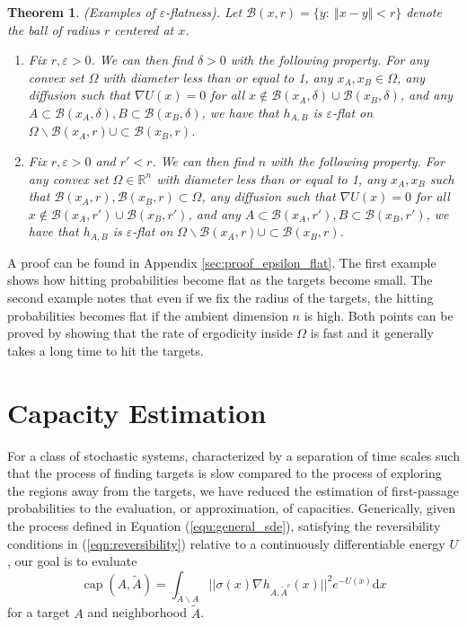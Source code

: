 \documentclass[12pt, nofootinbib,english, amsmath, amssymb, aps, priprint, graphicx,floatfix]{revtex4-1}
\newtheorem{theorem}{Theorem}
\theoremstyle{plain}
\theoremstyle{definition}
\theoremstyle{plain}
\newcommand{\bb}[1]{\mathcal{B}\left(#1\right)}
\newcommand{\tA}{{\tilde A}}
\begin{document}
\begin{theorem}\label{thm:epsilon_flat} (Examples of $\varepsilon$-flatness).   Let $\bb{x,r} = \{y:\ \Vert x-y \Vert < r\}$ denote the ball of radius $r$ centered at $x$.  
\begin{enumerate}
    \item Fix $r,\varepsilon>0$.  We can then find $\delta>0$ with the following property.  For any convex set $\Omega$ with diameter less than or equal to 1, any $x_A,x_B \in \Omega$, any diffusion such that $\nabla U(x) =0$ for all $x\notin \bb{x_A, \delta} \cup \bb{x_B, \delta}$, and any $A\subset \bb{x_A, \delta}, B \subset \bb{x_B, \delta}$, we have that $h_{A,B}$ is $\varepsilon$-flat on $\Omega \backslash \bb{x_A, r} \cup \subset \bb{x_B, r}$.

    \item Fix $r,\varepsilon>0$ and $r'<r$.  We can then find $n$ with the following property.  For any convex set $\Omega \in \mathbb{R}^n$ with diameter less than or equal to 1, any $x_A,x_B$ such that $\bb{x_A, r},\bb{x_B, r} \subset \Omega$, any diffusion such that $\nabla U(x) =0$ for all $x\notin \bb{x_A, r'} \cup \bb{x_B, r'}$, and any $A\subset \bb{x_A, r'}, B \subset \bb{x_B, r'}$, we have that $h_{A,B}$ is $\varepsilon$-flat on $\Omega \backslash \bb{x_A, r} \cup \subset \bb{x_B, r}$.
\end{enumerate}
\end{theorem}

A proof can be found in Appendix \ref{sec:proof_epsilon_flat}.  The first example shows how hitting probabilities become flat as the targets become small.  The second example notes that even if we fix the radius of the targets, the hitting probabilities becomes flat if the ambient dimension $n$ is high.  Both points can be proved by showing that the rate of ergodicity inside $\Omega$ is fast and it generally takes a long time to hit the targets.

\section{Capacity Estimation} 
\label{sec:Estimation}
For a class of stochastic systems, characterized by a separation of time scales such that the process of finding targets is slow compared to the process of exploring the regions away from the targets, we have reduced the estimation of first-passage probabilities to the evaluation, or approximation, of capacities.
Generically, given the process defined in Equation (\ref{equ:general_sde}), satisfying the reversibility conditions in (\ref{eqn:reversibility}) relative to a continuously differentiable energy $U$, our goal is to evaluate
\begin{equation}
\label{eqn:capacity}
\ensuremath{\operatorname{cap}} (A, \tilde{A}) = \int_{\tilde A \backslash A}
||\sigma(x) \nabla h_{A, \tilde{A}^c}(x)||^2 e^{- U(x)} \mathrm{d} x 
\end{equation}
for a target $A$ and neighborhood $\tA$.
\end{document}
